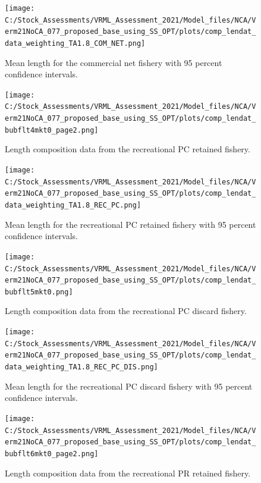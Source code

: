 \documentclass[11pt,
  english,
  a4paper,
]{article}
\begin{document}
\begin{figure}
\centering
\texttt{[image: C:/Stock\_Assessments/VRML\_Assessment\_2021/Model\_files/NCA/Verm21NoCA\_077\_proposed\_base\_using\_SS\_OPT/plots/comp\_lendat\_data\_weighting\_TA1.8\_COM\_NET.png]}
\caption{Mean length for the commercial net fishery with 95 percent confidence intervals.\label{fig:mean-com-len-data-COM-NET}}
\end{figure}

\begin{figure}
\centering
\texttt{[image: C:/Stock\_Assessments/VRML\_Assessment\_2021/Model\_files/NCA/Verm21NoCA\_077\_proposed\_base\_using\_SS\_OPT/plots/comp\_lendat\_bubflt4mkt0\_page2.png]}
\caption{Length composition data from the recreational PC retained fishery.\label{fig:len-data-REC-PC}}
\end{figure}

\begin{figure}
\centering
\texttt{[image: C:/Stock\_Assessments/VRML\_Assessment\_2021/Model\_files/NCA/Verm21NoCA\_077\_proposed\_base\_using\_SS\_OPT/plots/comp\_lendat\_data\_weighting\_TA1.8\_REC\_PC.png]}
\caption{Mean length for the recreational PC retained fishery with 95 percent confidence intervals.\label{fig:mean-com-len-data-REC-PC}}
\end{figure}

\begin{figure}
\centering
\texttt{[image: C:/Stock\_Assessments/VRML\_Assessment\_2021/Model\_files/NCA/Verm21NoCA\_077\_proposed\_base\_using\_SS\_OPT/plots/comp\_lendat\_bubflt5mkt0.png]}
\caption{Length composition data from the recreational PC discard fishery.\label{fig:len-data-REC-PC-DIS}}
\end{figure}

\begin{figure}
\centering
\texttt{[image: C:/Stock\_Assessments/VRML\_Assessment\_2021/Model\_files/NCA/Verm21NoCA\_077\_proposed\_base\_using\_SS\_OPT/plots/comp\_lendat\_data\_weighting\_TA1.8\_REC\_PC\_DIS.png]}
\caption{Mean length for the recreational PC discard fishery with 95 percent confidence intervals.\label{fig:mean-com-len-data-REC-PC-DIS}}
\end{figure}

\begin{figure}
\centering
\texttt{[image: C:/Stock\_Assessments/VRML\_Assessment\_2021/Model\_files/NCA/Verm21NoCA\_077\_proposed\_base\_using\_SS\_OPT/plots/comp\_lendat\_bubflt6mkt0\_page2.png]}
\caption{Length composition data from the recreational PR retained fishery.\label{fig:len-data-REC-PR}}
\end{figure}
\end{document}
